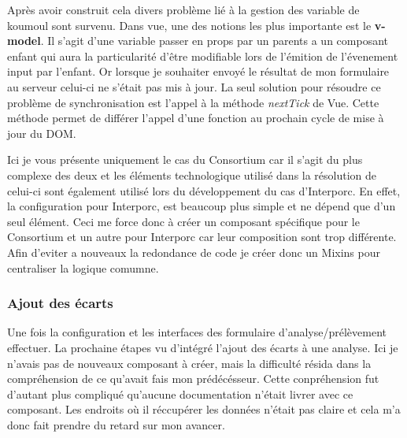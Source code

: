 Après avoir construit cela divers problème lié à la gestion des variable de koumoul sont survenu. Dans vue, une des notions les plus importante est le \textbf{v-model}\cite{vmodel}. Il s'agit d'une variable passer en props par un parents a un composant enfant qui aura la particularité d'être modifiable lors de l'émition de l'évenement input par l'enfant. Or lorsque je souhaiter envoyé le résultat de mon formulaire au serveur celui-ci ne s'était pas mis à jour. La seul solution pour résoudre ce problème de synchronisation est l'appel à la méthode \textit{nextTick}\cite{nextTick} de Vue. Cette méthode permet de différer l'appel d'une fonction au prochain cycle de mise à jour du DOM.


Ici je vous présente uniquement le cas du Consortium car il s'agit du plus complexe des deux et les éléments technologique utilisé dans la résolution de celui-ci sont également utilisé lors du développement du cas d'Interporc. En effet, la configuration pour Interporc, est beaucoup plus simple et ne dépend que d'un seul élément. Ceci me force donc à créer un composant spécifique pour le Consortium et un autre pour Interporc car leur composition sont trop différente. Afin d'eviter a nouveaux la redondance de code je créer donc un Mixins pour centraliser la logique comumne. 

\subsubsection{Ajout des écarts}
Une fois la configuration et les interfaces des formulaire d'analyse/prélèvement effectuer. La prochaine étapes vu d'intégré l'ajout des écarts à une analyse. Ici je n'avais pas de nouveaux composant à créer, mais la difficulté résida dans la compréhension de ce qu'avait fais mon prédécésseur. Cette conpréhension fut d'autant plus compliqué qu'aucune documentation n'était livrer avec ce composant. Les endroits où il réccupérer les données n'était pas claire et cela m'a donc fait prendre du retard sur mon avancer. 

